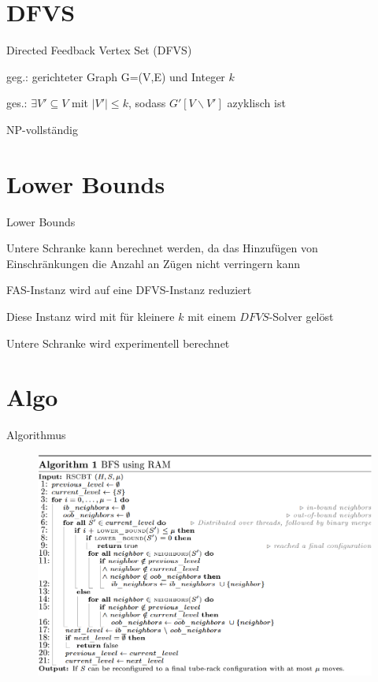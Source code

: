\documentclass{beamer}
\begin{document}
\section*{DFVS}
\begin{frame}{Directed Feedback Vertex Set (DFVS)}
\begin{pointlist}
\item geg.: gerichteter Graph G=(V,E) und Integer $k$
\item ges.: $\exists V' \subseteq V$ mit $|V'|\leq k$, sodass $G'[V\backslash V']$ azyklisch ist
\begin{arrowlist}
\item NP-vollständig
\end{arrowlist}
\end{pointlist}
\end{frame}

\section*{Lower Bounds}
\begin{frame}{Lower Bounds}
\begin{pointlist}
\item Untere Schranke kann berechnet werden, da das Hinzufügen von Einschränkungen die Anzahl an Zügen nicht verringern kann
\item FAS-Instanz wird auf eine DFVS-Instanz reduziert
\item Diese Instanz wird mit für kleinere $k$ mit einem $DFVS$-Solver gelöst
\item Untere Schranke wird experimentell berechnet
\end{pointlist}
\end{frame}


\section*{Algo}
\begin{frame}{Algorithmus}
\begin{figure}
    \centering
    \includegraphics[width=\textwidth]{algo}
\end{figure}
\end{frame}
\end{document}
